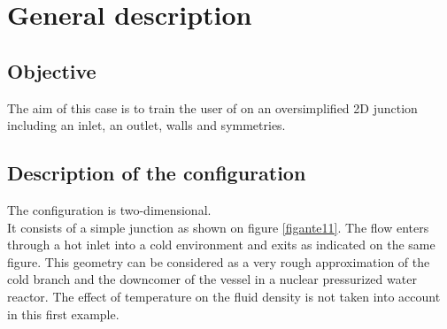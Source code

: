 %
%
%
%
%
%
%
\section{General description}


        \subsection{Objective}
The aim of this case is to train the user of \CS on an oversimplified 2D junction
including an inlet, an outlet, walls and symmetries.

        \subsection{Description of the configuration}

The configuration is two-dimensional.\\
It consists of a simple junction as shown on figure \ref{figante11}.
The flow enters through a hot inlet into a cold
environment and exits as indicated on the same figure. This geometry can be
considered as a very rough approximation of the cold branch and the downcomer of
the vessel in a nuclear pressurized water reactor. The effect of temperature on
the fluid density is not taken into account in this first example.

